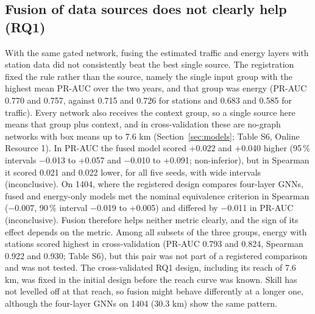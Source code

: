 \documentclass[pdflatex,sn-basic]{sn-jnl}
\begin{document}
\subsection{Fusion of data sources does not clearly help (RQ1)}\label{sec:fusion}

With the same gated network, fusing the estimated traffic and energy layers with station data did not consistently beat the best single source. The registration fixed the rule rather than the source, namely the single input group with the highest mean PR-AUC over the two years, and that group was energy (PR-AUC 0.770 and 0.757, against 0.715 and 0.726 for stations and 0.683 and 0.585 for traffic). Every network also receives the context group, so a single source here means that group plus context, and in cross-validation these are no-graph networks with box means up to 7.6 km (Section~\ref{sec:models}; Table S6, Online Resource 1). In PR-AUC the fused model scored +0.022 and +0.040 higher (95\,\% intervals −0.013 to +0.057 and −0.010 to +0.091; non-inferior), but in Spearman it scored 0.021 and 0.022 lower, for all five seeds, with wide intervals (inconclusive). On 1404, where the registered design compares four-layer GNNs, fused and energy-only models met the nominal equivalence criterion in Spearman (−0.007, 90\,\% interval −0.019 to +0.005) and differed by −0.011 in PR-AUC (inconclusive). Fusion therefore helps neither metric clearly, and the sign of its effect depends on the metric. Among all subsets of the three groups, energy with stations scored highest in cross-validation (PR-AUC 0.793 and 0.824, Spearman 0.922 and 0.930; Table S6), but this pair was not part of a registered comparison and was not tested. The cross-validated RQ1 design, including its reach of 7.6 km, was fixed in the initial design before the reach curve was known. Skill has not levelled off at that reach, so fusion might behave differently at a longer one, although the four-layer GNNs on 1404 (30.3 km) show the same pattern.
\end{document}
